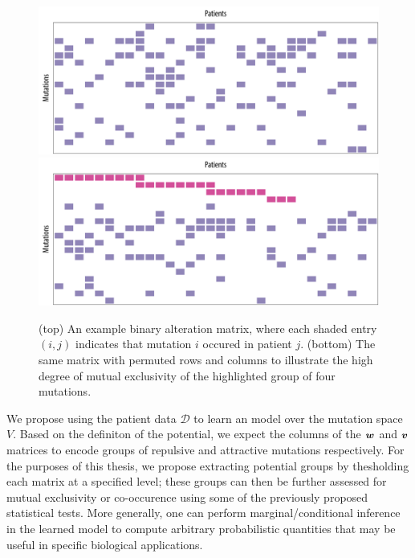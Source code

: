 \begin{figure}[htb]
\centering
\includegraphics[width=\textwidth]{figures/genes/example1.pdf}\\[1em]
\includegraphics[width=\textwidth]{figures/genes/example1_rep.pdf}\\[1em]
\caption{(top) An example binary alteration matrix, where each shaded entry $(i, j)$ indicates that mutation $i$ occured in patient $j$. (bottom) The same matrix with permuted rows and columns to illustrate the high degree of mutual exclusivity of the highlighted group of four mutations.}
\label{fig:bamats}
\end{figure}

We propose using the patient data $\mathcal{D}$ to learn an \fldc{} model over the mutation space $V$.
Based on the definiton of the \fldc{} potential, we expect the columns of the $\bm{w}$ and $\bm{v}$ matrices to encode groups of repulsive and attractive mutations respectively.
For the purposes of this thesis, we propose extracting potential groups by thesholding each matrix at a specified level; these groups can then be further assessed for mutual exclusivity or co-occurence using some of the previously proposed statistical tests.
More generally, one can perform marginal/conditional inference in the learned model to compute arbitrary probabilistic quantities that may be useful in specific biological applications.

